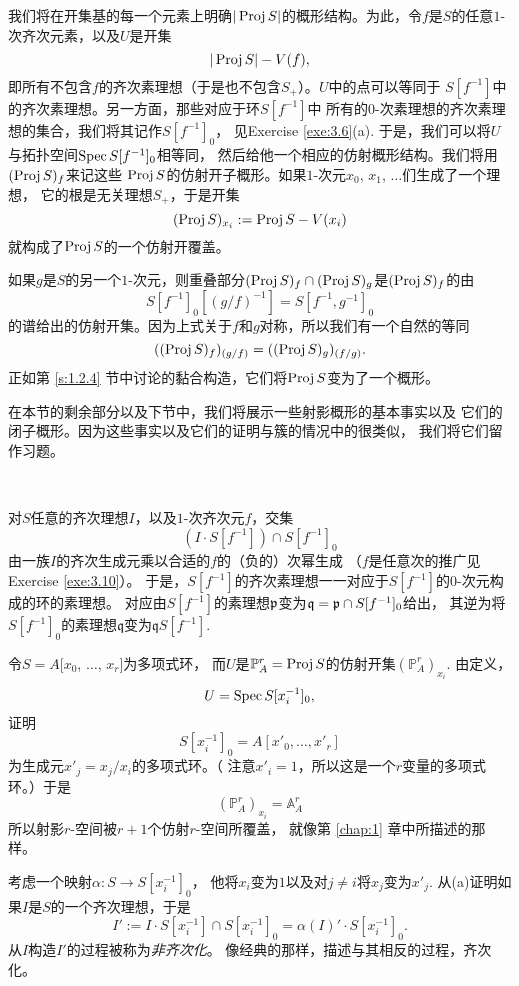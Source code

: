 我们将在开集基的每一个元素上明确$|\operatorname{Proj} S|$的概形结构。为此，令$f$是$S$的任意$1$-次齐次元素，以及$U$是开集
\[
	|\operatorname{Proj} S|-V(f),
\]
即所有不包含$f$的齐次素理想（于是也不包含$S_+$）。$U$中的点可以等同于
$S[f^{-1}]$中的齐次素理想。另一方面，那些对应于环$S[f^{-1}]$中
所有的$0$-次素理想的齐次素理想的集合，我们将其记作$S[f^{-1}]_0$，
见Exercise \ref{exe:3.6}(a). 
于是，我们可以将$U$与拓扑空间$\operatorname{Spec} S[f^{-1}]_0$相等同，
然后给他一个相应的仿射概形结构。我们将用$(\operatorname{Proj} S)_f$来记这些
$\operatorname{Proj} S$的仿射开子概形。如果$1$-次元$x_0$, $x_1$, $\dots$们生成了一个理想，
它的根是无关理想$S_+$，于是开集
\[
	(\operatorname{Proj} S)_{x_i}:=\operatorname{Proj} S-V(x_i)
\]
就构成了$\operatorname{Proj} S$的一个仿射开覆盖。

如果$g$是$S$的另一个$1$-次元，则重叠部分$(\operatorname{Proj} S)_f\cap (\operatorname{Proj} S)_g$是$(\operatorname{Proj} S)_f$的由
\[
	S[f^{-1}]_0[(g/f)^{-1}]=S[f^{-1},g^{-1}]_0
\]
的谱给出的仿射开集。因为上式关于$f$和$g$对称，所以我们有一个自然的等同
\[
	((\operatorname{Proj} S)_f)_{(g/f)}=((\operatorname{Proj} S)_g)_{(f/g)}.
\]
正如第 \ref{s:1.2.4} 节中讨论的黏合构造，它们将$\operatorname{Proj} S$变为了一个概形。

在本节的剩余部分以及下节中，我们将展示一些射影概形的基本事实以及
它们的闭子概形。因为这些事实以及它们的证明与簇的情况中的很类似，
我们将它们留作习题。


\begin{exe}~\label{exe:3.6}
\begin{compactenum}[(a)]
\item 对$S$任意的齐次理想$I$，以及$1$-次齐次元$f$，交集
\[
	(I\cdot S[f^{-1}])\cap S[f^{-1}]_0
\]
由一族$I$的齐次生成元乘以合适的$f$的（负的）次幂生成
（$f$是任意次的推广见 Exercise \ref{exe:3.10}）。
于是，$S[f^{-1}]$的齐次素理想一一对应于$S[f^{-1}]$的$0$-次元构成的环的素理想。
对应由$S[f^{-1}]$的素理想$\mathfrak{p}$变为$\mathfrak q=\mathfrak{p}\cap S[f^{-1}]_0$给出，
其逆为将$S[f^{-1}]_0$的素理想$\mathfrak{q}$变为$\mathfrak qS[f^{-1}]$.

\item 令$S=A[x_0$, $\dots$, $x_r]$为多项式环，
而$U$是$\mathbb P_A^r=\operatorname{Proj} S$的仿射开集$(\mathbb P_A^r)_{x_i}$. 由定义，
\[
	U=\operatorname{Spec} S[x_i^{-1}]_0,
\]
证明
\[
	S[x_i^{-1}]_0=A[x'_0,\dots,x'_r]
\]
为生成元$x'_j=x_j/x_i$的多项式环。（
注意$x'_i=1$，所以这是一个$r$变量的多项式环。）于是
\[
	(\mathbb P^r_A)_{x_i}=\mathbb A_A^r
\]
所以射影$r$-空间被$r+1$个仿射$r$-空间所覆盖，
就像第 \ref{chap:1} 章中所描述的那样。

\item 考虑一个映射$\alpha:S\to S[x_i^{-1}]_0$，
他将$x_i$变为$1$以及对$j\neq i$将$x_j$变为$x'_j$. 
从(a)证明如果$I$是$S$的一个齐次理想，于是
\[
	I':=I\cdot S[x_i^{-1}]\cap S[x_i^{-1}]_0=\alpha(I)'\cdot S[x_i^{-1}]_0.
\]
从$I$构造$I'$的过程被称为\textit{非齐次化}。
像经典的那样，描述与其相反的过程，齐次化。
\end{compactenum}
\end{exe}

